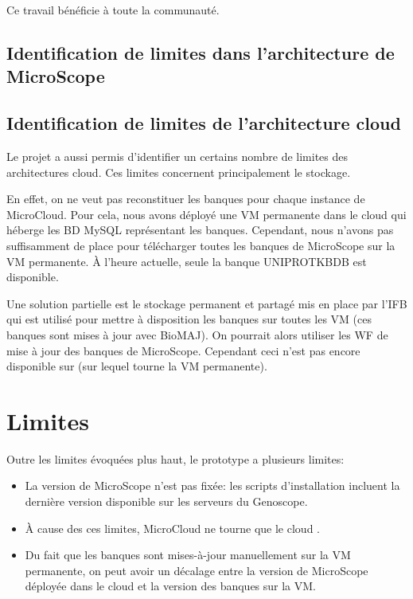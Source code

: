 Ce travail bénéficie à toute la communauté.

\subsection{Identification de limites dans l'architecture de MicroScope}


\subsection{Identification de limites de l'architecture cloud}

Le projet a aussi permis d'identifier un certains nombre de limites des architectures cloud.
Ces limites concernent principalement le stockage.

En effet, on ne veut pas reconstituer les banques pour chaque instance de MicroCloud.
Pour cela, nous  avons déployé une VM permanente dans le cloud 
qui héberge les BD MySQL représentant les banques.
Cependant, nous n'avons pas suffisamment de place pour télécharger toutes les banques de MicroScope sur la VM permanente.
À l'heure actuelle, seule la banque UNIPROTKBDB est disponible.

Une solution partielle est le stockage permanent et partagé mis en place par l'IFB
qui est utilisé pour mettre à disposition les banques sur toutes les VM (ces banques sont mises à jour avec BioMAJ).
On pourrait alors utiliser les WF de mise à jour des banques de MicroScope.
Cependant ceci n'est pas encore disponible sur  (sur lequel tourne la VM permanente).

\section{Limites}

Outre les limites évoquées plus haut, le prototype a plusieurs limites:
\begin{itemize}
	\item La version de MicroScope n'est pas fixée: les scripts d'installation incluent la dernière version disponible sur les serveurs du Genoscope.
	\item À cause des ces limites, MicroCloud ne tourne que le cloud .
	\item Du fait que les banques sont mises-à-jour manuellement sur la VM permanente, on peut avoir un décalage entre la version de MicroScope déployée dans le cloud
	et la version des banques sur la VM.
\end{itemize}

